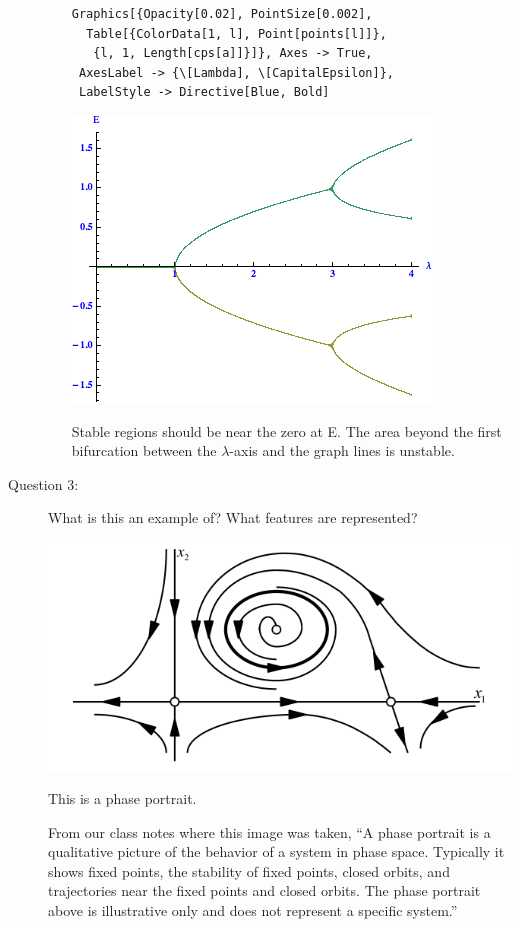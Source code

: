 \documentclass[letterpaper,10pt]{article}
\begin{document}
\begin{description}
\begin{enumerate}
\begin{verbatim}
Graphics[{Opacity[0.02], PointSize[0.002],
  Table[{ColorData[1, l], Point[points[l]]},
   {l, 1, Length[cps[a]]}]}, Axes -> True, 
 AxesLabel -> {\[Lambda], \[CapitalEpsilon]}, 
 LabelStyle -> Directive[Blue, Bold]
  \end{verbatim}
  \begin{center}
    \includegraphics[scale=0.75]{images/problem2.png}
  \end{center}
  Stable regions should be near the zero at E.  The area beyond the first bifurcation between the $\lambda$-axis and the graph lines is unstable.
\end{enumerate}

\item[Question 3:]
What is this an example of?  What features are represented?
\begin{center}
  \includegraphics[scale=0.65]{images/phaseportrait.png}
\end{center}

This is a phase portrait.

From our class notes where this image was taken, ``A phase portrait is a qualitative picture of the behavior of a system in phase space.  Typically it shows fixed points, the stability of fixed points, closed orbits, and trajectories near the fixed points and closed orbits.  The phase portrait above is illustrative only and does not represent a specific system.''


\end{description}
\end{document}
